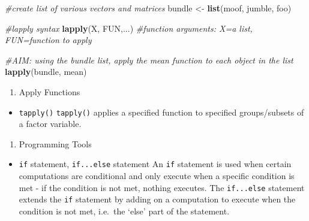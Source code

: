 \documentclass[]{book}
\newenvironment{Shaded}{\begin{snugshade}}{\end{snugshade}}
\newcommand{\CommentTok}[1]{\textcolor[rgb]{0.56,0.35,0.01}{\textit{#1}}}
\newcommand{\KeywordTok}[1]{\textcolor[rgb]{0.13,0.29,0.53}{\textbf{#1}}}
\newcommand{\NormalTok}[1]{#1}
\newcommand{\OperatorTok}[1]{\textcolor[rgb]{0.81,0.36,0.00}{\textbf{#1}}}
\newcommand{\StringTok}[1]{\textcolor[rgb]{0.31,0.60,0.02}{#1}}
\providecommand{\tightlist}{%
  \setlength{\itemsep}{0pt}\setlength{\parskip}{0pt}}
\begin{document}
\begin{Shaded}
\begin{Highlighting}[]
\CommentTok{#create list of various vectors and matrices}
\NormalTok{bundle <-}\StringTok{ }\KeywordTok{list}\NormalTok{(moof, jumble, foo) }

\CommentTok{#lapply syntax}
\KeywordTok{lapply}\NormalTok{(X, FUN,...) }\CommentTok{#function arguments: X=a list, FUN=function to apply}

\CommentTok{#AIM: using the bundle list, apply the mean function to each object in the list}
\KeywordTok{lapply}\NormalTok{(bundle, mean)}
\end{Highlighting}
\end{Shaded}

\begin{enumerate}
\def\labelenumi{\arabic{enumi}.}
\setcounter{enumi}{18}
\tightlist
\item
  Apply Functions
\end{enumerate}

\begin{itemize}
\tightlist
\item
  \texttt{tapply()}
  \texttt{tapply()} applies a specified function to specified groups/subsets of a factor variable.
\end{itemize}

\begin{Shaded}
\end{Shaded}

\begin{enumerate}
\def\labelenumi{\arabic{enumi}.}
\setcounter{enumi}{19}
\tightlist
\item
  Programming Tools
\end{enumerate}

\begin{itemize}
\tightlist
\item
  \texttt{if} statement, \texttt{if...else} statement
  An \texttt{if} statement is used when certain computations are conditional and only execute when a specific condition is met - if the condition is not met, nothing executes. The \texttt{if...else} statement extends the \texttt{if} statement by adding on a computation to execute when the condition is not met, i.e.~the `else' part of the statement.
\end{itemize}
\end{document}

